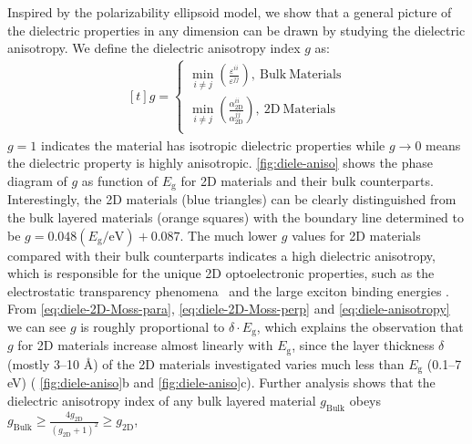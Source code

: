 Inspired by the polarizability ellipsoid model, we show that a general picture of the dielectric properties in
any dimension can be drawn by studying the dielectric
anisotropy. We define the dielectric anisotropy index $g$ as:
\begin{equation}
  \label{eq:diele-anisotropy}
  \begin{aligned}[t]
    g =
    \begin{cases}
      {\displaystyle \min_{i \neq j}}
      {\displaystyle
        \left(\frac{\varepsilon^{ii}}{\varepsilon^{jj}}\right)},
      \ \mathrm{Bulk\ Materials}\\
      {\displaystyle \min_{i \neq j}}
      {\displaystyle
        \left(\frac{\alpha_{\mathrm{2D}}^{ii}}{\alpha_{\mathrm{2D}}^{jj}}\right)},
      \ \mathrm{2D\ Materials}\\
    \end{cases}
  \end{aligned}
\end{equation}
$g=1$ indicates the material has isotropic dielectric properties while
$g \to 0$ means the dielectric property is highly anisotropic.
\autoref{fig:diele-aniso} shows the phase diagram of $g$ as function
of $E_{\mathrm{g}}$ for 2D materials and their bulk
counterparts. Interestingly, the 2D materials (blue triangles) can be
clearly distinguished from the bulk layered materials (orange squares)
with the boundary line determined to be
$g =0.048 (E_{\mathrm{g}}/ \mathrm{eV})+0.087$. The much lower $g$
values for 2D materials compared with their bulk counterparts
indicates a high dielectric anisotropy, which is responsible for the
unique 2D optoelectronic properties, such as the electrostatic
transparency phenomena~\autocite{Li_2014_screen} and the large exciton binding energies
\autocite{Pulci_2014_exciton,Tran_2014_gap_ML_BP,Chernikov_2014_EB_MoS2_2D3D,Berkelbach_2013_exciton}. From
\autoref{eq:diele-2D-Moss-para}, \autoref{eq:diele-2D-Moss-perp} and
\autoref{eq:diele-anisotropy} we can see $g$ is roughly proportional
to $\delta \cdot E_{\mathrm{g}}$, which explains the observation that
$g$ for 2D materials increase almost linearly with $E_{\mathrm{g}}$,
since the layer thickness $\delta$ (mostly 3--10 \AA{}) of the 2D
materials investigated varies much less than $E_{\mathrm{g}}$ (0.1--7
eV) ( \autoref{fig:diele-aniso}b and
\autoref{fig:diele-aniso}c). Further analysis shows that the
dielectric anisotropy index of any bulk layered material
$g_{\mathrm{Bulk}}$ obeys
$g_{\mathrm{Bulk}} \geq {\displaystyle \frac{4
    g_{\mathrm{2D}}}{(g_{\mathrm{2D}}+1)^{2}}} \geq g_{\mathrm{2D}}$,
